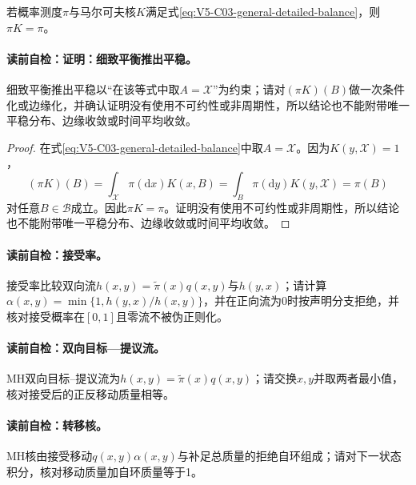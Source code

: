 \label{struct:V5-C03-CH12}
\begin{proposition}[细致平衡推出平稳]\label{prop:V5-C03-db-stationary}
若概率测度$\pi$与马尔可夫核$K$满足式\eqref{eq:V5-C03-general-detailed-balance}，则$\pi K=\pi$。
\end{proposition}

\label{struct:V5-C03-CH13}
\paragraph{读前自检：证明：细致平衡推出平稳。}细致平衡推出平稳以“在该等式中取$A=\mathcal X$”为约束；请对$(\pi K)(B)$做一次条件化或边缘化，并确认证明没有使用不可约性或非周期性，所以结论也不能附带唯一平稳分布、边缘收敛或时间平均收敛。\par

\begin{proof}
在式\eqref{eq:V5-C03-general-detailed-balance}中取$A=\mathcal X$。因为$K(y,\mathcal X)=1$，
\[
(\pi K)(B)
=\int_{\mathcal X}\pi(\mathrm dx)K(x,B)
=\int_B\pi(\mathrm dy)K(y,\mathcal X)
=\pi(B)
\]
对任意$B\in\mathcal B$成立。因此$\pi K=\pi$。证明没有使用不可约性或非周期性，所以结论也不能附带唯一平稳分布、边缘收敛或时间平均收敛。
\end{proof}

\paragraph{读前自检：\MetropolisHastings{}接受率。}\MetropolisHastings{}接受率比较双向流$h(x,y)=\widetilde\pi(x)q(x,y)$与$h(y,x)$；请计算$\alpha(x,y)=\min\{1,h(y,x)/h(x,y)\}$，并在正向流为0时按声明分支拒绝，并核对接受概率在$[0,1]$且零流不被伪正则化。\par
\paragraph{读前自检：双向目标—提议流。}MH双向目标--提议流为$h(x,y)=\widetilde\pi(x)q(x,y)$；请交换$x,y$并取两者最小值，核对接受后的正反移动质量相等。\par
\paragraph{读前自检：\MetropolisHastings{}转移核。}MH核由接受移动$q(x,y)\alpha(x,y)$与补足总质量的拒绝自环组成；请对下一状态积分，核对移动质量加自环质量等于1。\par
